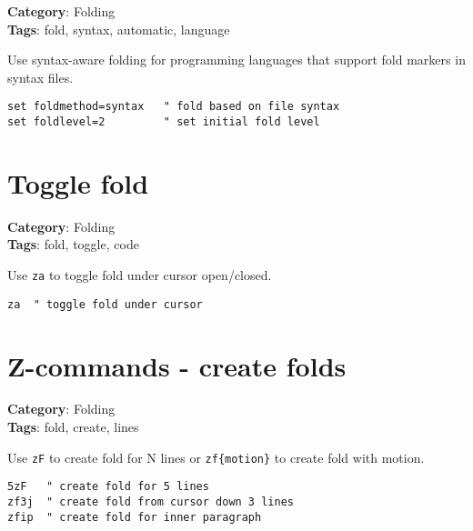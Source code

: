{{{{{{\textbf{Category}: Folding\\ \textbf{Tags}: fold, syntax, automatic, language
\vspace{0.5cm}

Use syntax-aware folding for programming languages that support fold markers in syntax files.

\begin{Exa*}{}
\begin{Verbatim}[fontsize=\footnotesize, breaklines, breakanywhere]
set foldmethod=syntax   " fold based on file syntax
set foldlevel=2         " set initial fold level
\end{Verbatim}
\end{Exa*}

\section{Toggle fold}

\textbf{Category}: Folding\\ \textbf{Tags}: fold, toggle, code
\vspace{0.5cm}

Use {\footnotesize \Verb§za§} to toggle fold under cursor open/closed.

\begin{Exa*}{}
\begin{Verbatim}[fontsize=\footnotesize, breaklines, breakanywhere]
za  " toggle fold under cursor
\end{Verbatim}
\end{Exa*}

\section{Z-commands - create folds}

\textbf{Category}: Folding\\ \textbf{Tags}: fold, create, lines
\vspace{0.5cm}

Use {\footnotesize \Verb§zF§} to create fold for N lines or {\footnotesize \Verb§zf{motion}§} to create fold with motion.

\begin{Exa*}{}
\begin{Verbatim}[fontsize=\footnotesize, breaklines, breakanywhere]
5zF   " create fold for 5 lines
zf3j  " create fold from cursor down 3 lines
zfip  " create fold for inner paragraph
\end{Verbatim}
\end{Exa*}

}}}}}}
